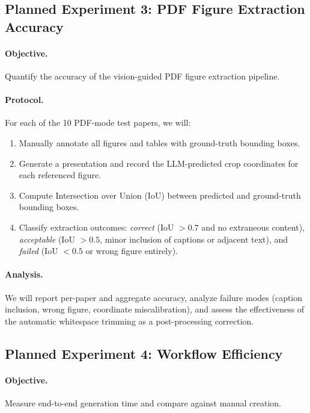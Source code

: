 \documentclass[11pt,a4paper]{article}
\begin{document}
\subsection{Planned Experiment 3: PDF Figure Extraction Accuracy}
\label{sec:eval-pdfcrop}

\paragraph{Objective.}
Quantify the accuracy of the vision-guided PDF figure extraction pipeline.

\paragraph{Protocol.}
For each of the 10 PDF-mode test papers, we will:

\begin{enumerate}[leftmargin=*,nosep]
    \item Manually annotate all figures and tables with ground-truth bounding boxes.
    \item Generate a presentation and record the LLM-predicted crop coordinates for each referenced figure.
    \item Compute Intersection over Union (IoU) between predicted and ground-truth bounding boxes.
    \item Classify extraction outcomes: \emph{correct} (IoU $> 0.7$ and no extraneous content), \emph{acceptable} (IoU $> 0.5$, minor inclusion of captions or adjacent text), and \emph{failed} (IoU $< 0.5$ or wrong figure entirely).
\end{enumerate}

\paragraph{Analysis.}
We will report per-paper and aggregate accuracy, analyze failure modes (caption inclusion, wrong figure, coordinate miscalibration), and assess the effectiveness of the automatic whitespace trimming as a post-processing correction.

\subsection{Planned Experiment 4: Workflow Efficiency}
\label{sec:eval-time}

\paragraph{Objective.}
Measure end-to-end generation time and compare against manual creation.
\end{document}
